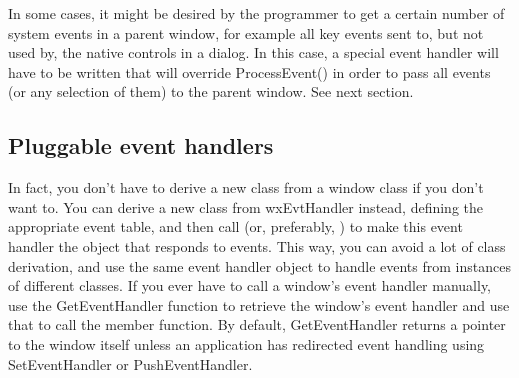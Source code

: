 \begin{twocollist}\itemsep=0pt
\end{twocollist}

In some cases, it might be desired by the programmer to get a certain number
of system events in a parent window, for example all key events sent to, but not
used by, the native controls in a dialog. In this case, a special event handler
will have to be written that will override ProcessEvent() in order to pass
all events (or any selection of them) to the parent window. See next section.

\subsection{Pluggable event handlers}

In fact, you don't have to derive a new class from a window class
if you don't want to. You can derive a new class from wxEvtHandler instead,
defining the appropriate event table, and then call
\rtfsp{} (or, preferably,
\rtfsp{}) to make this
event handler the object that responds to events. This way, you can avoid
a lot of class derivation, and use the same event handler object to
handle events from instances of different classes. If you ever have to call a window's event handler
manually, use the GetEventHandler function to retrieve the window's event handler and use that
to call the member function. By default, GetEventHandler returns a pointer to the window itself
unless an application has redirected event handling using SetEventHandler or PushEventHandler.

